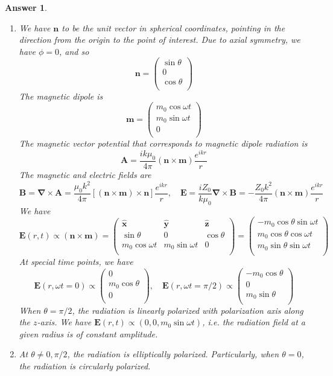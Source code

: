\documentclass[a4paper]{article}
\newtheorem{ans}{Answer}
\theoremstyle{new}
\begin{document}
\begin{ans}\leavevmode
\begin{enumerate}[label=(\alph*)]
\item We have $\mathbf{n}$ to be the unit vector in spherical coordinates, pointing in the direction from the origin to the point of interest. Due to axial symmetry, we have $\phi=0$, and so
$$\mathbf{n}=\begin{pmatrix}\sin\theta\\0\\\cos\theta\\\end{pmatrix}$$
The magnetic dipole is
$$\mathbf{m}=\begin{pmatrix}m_0\cos\omega t\\m_0\sin\omega t\\0\\\end{pmatrix}$$
The magnetic vector potential that corresponds to magnetic dipole radiation is
$$\mathbf{A}=\frac{ik\mu_0}{4\pi}(\mathbf{n}\times\mathbf{m})\frac{e^{ikr}}{r}$$
The magnetic and electric fields are
$$\mathbf{B}=\boldsymbol{\nabla}\times\mathbf{A}=\frac{\mu_0k^2}{4\pi}[(\mathbf{n}\times\mathbf{m})\times\mathbf{n}]\frac{e^{ikr}}{r},\quad\mathbf{E}=\frac{iZ_0}{k\mu_0}\boldsymbol{\nabla}\times\mathbf{B}=-\frac{Z_0k^2}{4\pi}(\mathbf{n}\times\mathbf{m})\frac{e^{ikr}}{r}$$
We have
$$\mathbf{E}(r,t)\propto(\mathbf{n}\times\mathbf{m})=\begin{pmatrix}\mathbf{\hat{x}}&\mathbf{\hat{y}}&\mathbf{\hat{z}}\\\sin\theta&0&\cos\theta\\m_0\cos\omega t&m_0\sin\omega t&0\\\end{pmatrix}=\begin{pmatrix}-m_0\cos\theta\sin\omega t\\m_0\cos\theta\cos\omega t\\m_0\sin\theta\sin\omega t\\\end{pmatrix}$$
At special time points, we have
$$\mathbf{E}(r,\omega t=0)\propto\begin{pmatrix}0\\m_0\cos\theta\\0\\\end{pmatrix},\quad\mathbf{E}(r,\omega t=\pi/2)\propto\begin{pmatrix}-m_0\cos\theta\\0\\m_0\sin\theta\\\end{pmatrix}$$
When $\theta=\pi/2$, the radiation is linearly polarized with polarization axis along the $z$-axis. We have $\mathbf{E}(r,t)\propto(0,0,m_0\sin\omega t)$, i.e. the radiation field at a given radius is of constant amplitude.
\item At $\theta\neq 0,\pi/2$, the radiation is elliptically polarized. Particularly, when $\theta=0$, the radiation is circularly polarized.
\end{enumerate}
\end{ans}
\end{document}
